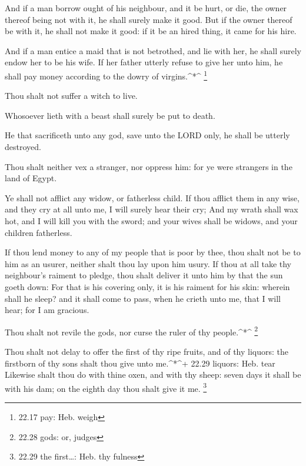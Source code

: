  And if a man borrow ought of his neighbour, and it be
hurt, or die, the owner thereof being not with it, he shall surely make
it good.  But if the owner thereof be with it, he shall not
make it good: if it be an hired thing, it came for his hire.

 And if a man entice a maid that is not betrothed, and lie
with her, he shall surely endow her to be his wife.  If her
father utterly refuse to give her unto him, he shall pay money according
to the dowry of virgins.\^{}*\^{} \footnote{22.17 pay: Heb. weigh}

 Thou shalt not suffer a witch to live.

 Whosoever lieth with a beast shall surely be put to death.

 He that sacrificeth unto any god, save unto the LORD only,
he shall be utterly destroyed.

 Thou shalt neither vex a stranger, nor oppress him: for ye
were strangers in the land of Egypt.

 Ye shall not afflict any widow, or fatherless child.
 If thou afflict them in any wise, and they cry at all unto
me, I will surely hear their cry;  And my wrath shall wax
hot, and I will kill you with the sword; and your wives shall be widows,
and your children fatherless.

 If thou lend money to any of my people that is poor by
thee, thou shalt not be to him as an usurer, neither shalt thou lay upon
him usury.  If thou at all take thy neighbour's raiment to
pledge, thou shalt deliver it unto him by that the sun goeth down:
 For that is his covering only, it is his raiment for his
skin: wherein shall he sleep? and it shall come to pass, when he crieth
unto me, that I will hear; for I am gracious.

 Thou shalt not revile the gods, nor curse the ruler of thy
people.\^{}*\^{} \footnote{22.28 gods: or, judges}

 Thou shalt not delay to offer the first of thy ripe
fruits, and of thy liquors: the firstborn of thy sons shalt thou give
unto me.\^{}*\^{}+ 22.29 liquors: Heb. tear  Likewise shalt
thou do with thine oxen, and with thy sheep: seven days it shall be with
his dam; on the eighth day thou shalt give it me. \footnote{22.29 the
  first\ldots: Heb. thy fulness}

